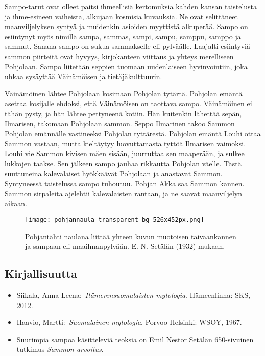   Sampo-tarut ovat olleet paitsi ihmeellisiä kertomuksia kahden kansan taistelusta ja 
  ihme-esineen vaiheista, alkujaan kosmisia kuvauksia. Ne ovat selittäneet maanviljelyksen syntyä ja 
  muidenkin asioiden myyttistä alkuperää. Sampo on esiintynyt myös nimillä sampa, sammas, sampi, 
  sampu, samppu, samppo ja sammut. Sanana sampo on sukua sammakselle eli pylväälle. Laajalti 
  esiintyviä sammon piirteitä ovat hyvyys, kirjokanteen viittaus ja yhteys merelliseen Pohjolaan. 
  Sampo liitetään seppien tuomaan uudenlaiseen hyvinvointiin, joka uhkaa sysäyttää Väinämöisen 
  ja tietäjäkulttuurin.

  Väinämöinen lähtee Pohjolaan kosimaan Pohjolan tytärtä. Pohjolan emäntä a\-settaa kosijalle 
  ehdoksi, että Väinämöisen on taottava sampo. Väinämöinen ei tähän pysty, ja hän lähtee 
  pettyneenä kotiin. Hän kuitenkin lähettää sepän, Ilmarisen, takomaan Pohjolaan sammon. Seppo 
  Ilmarinen takoo Sammon Pohjolan emännälle vastineeksi Pohjolan tyttärestä. Pohjolan emäntä 
  Louhi ottaa Sammon vastaan, mutta kieltäytyy luovuttamasta tyttöä Ilmarisen vaimoksi. Louhi vie 
  Sammon kivisen mäen sisään, juurruttaa sen maaperään, ja sulkee lukkojen taakse. Sen jälkeen 
  sampo jauhaa rikkautta Pohjolan väelle. Tästä suuttuneina kalevalaiset hyökkäävät Pohjolaan ja 
  anastavat Sammon. Syntyneessä taistelussa sampo tuhoutuu. Pohjan Akka saa Sammon kannen. Sammon 
  sirpaleita ajelehtii kalevalaisten rantaan, ja ne saavat maanviljelyn aikaan.

  \begin{figure}[!hb]%
    \centering%
    \texttt{[image: pohjannaula\_transparent\_bg\_526x452px.png]}%
    \caption{Pohjantähti naulana liittää yhteen kuvun muotoisen taivaankannen ja sampaan eli maailmanpylvään. E. N. Setälän (1932) mukaan.}%
  \end{figure}
  
  
\subsection{Kirjallisuutta}

  \begin{itemize}
    \item Siikala, Anna-Leena: \emph{Itämerensuomalaisten mytologia}. Hämeenlinna: SKS, 2012. 
    \item Haavio, Martti: \emph{Suomalainen mytologia}. Porvoo Helsinki: WSOY, 1967. 
    \item Suurimpia sampoa käsitteleviä teoksia on Emil Nestor Setälän 650-sivuinen tutkimus \emph{Sammon arvoitus}.
  \end{itemize}

